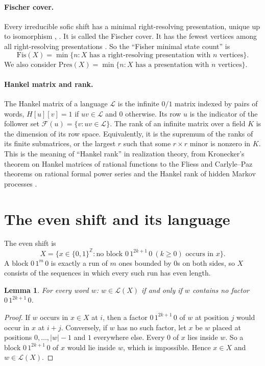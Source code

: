 \documentclass[11pt]{article}
\newtheorem{lemma}[theorem]{Lemma}
\theoremstyle{definition}
\theoremstyle{remark}
\newcommand{\Lang}{\mathcal{L}}
\newcommand{\F}{\mathcal{F}}
\begin{document}
\paragraph{Fischer cover.} Every irreducible sofic shift has a minimal
right-resolving presentation, unique up to isomorphism \cite{fischer},
\cite[\S3.3]{lm}. It is called the Fischer cover. It has the fewest
vertices among all right-resolving presentations \cite[\S3.3]{lm}. So
the ``Fisher minimal state count'' is
\[
\mathrm{Fis}(X)=\min\{n : X \text{ has a right-resolving presentation with } n \text{ vertices}\}.
\]
We also consider $\mathrm{Pres}(X)=\min\{n : X \text{ has a presentation with } n \text{ vertices}\}$.

\paragraph{Hankel matrix and rank.} The Hankel matrix of a language $\Lang$
is the infinite $0/1$ matrix indexed by pairs of words,
$H[u][v]=1$ if $uv\in\Lang$ and $0$ otherwise. Its row $u$ is the indicator
of the follower set $\F(u)=\{v: uv\in\Lang\}$. The rank of an infinite matrix
over a field $K$ is the dimension of its row space. Equivalently, it is the
supremum of the ranks of its finite submatrices, or the largest $r$ such
that some $r\times r$ minor is nonzero in $K$. This is the meaning of ``Hankel
rank'' in realization theory, from Kronecker's theorem on Hankel matrices of
rational functions to the Fliess and Carlyle--Paz theorems on rational formal
power series and the Hankel rank of hidden Markov processes
\cite{fliess,cp,ito}.

\section{The even shift and its language}

The even shift is
\[
X=\{x\in\{0,1\}^{\mathbb Z} : \text{no block } 0\,1^{2k+1}\,0 \ (k\ge 0) \text{ occurs in } x\}.
\]
A block $0\,1^m\,0$ is exactly a run of $m$ ones bounded by $0$s on both sides,
so $X$ consists of the sequences in which every such run has even length.

\begin{lemma}\label{lem:lang}
For every word $w$: $w\in\Lang(X)$ if and only if $w$ contains no factor
$0\,1^{2k+1}\,0$.
\end{lemma}
\begin{proof}
If $w$ occurs in $x\in X$ at $i$, then a factor $0\,1^{2k+1}\,0$ of $w$ at
position $j$ would occur in $x$ at $i+j$. Conversely, if $w$ has no such
factor, let $x$ be $w$ placed at positions $0,\dots,|w|-1$ and $1$
everywhere else. Every $0$ of $x$ lies inside $w$. So a block
$0\,1^{2k+1}\,0$ of $x$ would lie inside $w$, which is impossible. Hence
$x\in X$ and $w\in\Lang(X)$.
\end{proof}
\end{document}
